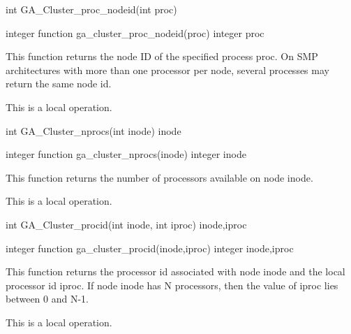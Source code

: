 \documentclass[12pt]{article}
\begin{document}
\begin{capi}
int GA_Cluster_proc_nodeid(int proc)
\end{capi}
\begin{fapi}
integer function ga_cluster_proc_nodeid(proc)
   integer proc           \access{[input]} 
\end{fapi}

\begin{desc}

This function returns the node ID of the specified process proc.  On SMP architectures with more than one processor per node, several processes may return the same node id.

This is a  local operation.
\end{desc}


\begin{capi}
int GA_Cluster_nprocs(int inode)
   inode                 \access{[input]} 
\end{capi}
\begin{fapi}
integer function ga_cluster_nprocs(inode)
   integer inode                 \access{[input]} 
\end{fapi}

\begin{desc}

This function returns the number of processors available on node inode.

This is a  local operation.
\end{desc}


\begin{capi}
int GA_Cluster_procid(int inode, int iproc)
   inode,iproc           \access{[input]} 
\end{capi}
\begin{fapi}
integer function ga_cluster_procid(inode,iproc)
   integer inode,iproc           \access{[input]} 
\end{fapi}

\begin{desc}

This function returns the processor id associated with node inode and the local processor id iproc. If node inode has N processors, then the value of iproc lies between 0 and N-1.

This is a  local operation.
\end{desc}

\end{document}
